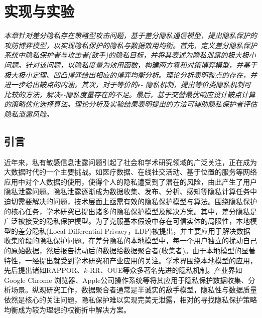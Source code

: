 \chapter{实现与实验}\label{chapter06}
{\em 本章针对差分隐私存在策略型攻击问题，基于差分隐私通信模型，提出隐私保护的攻防博弈模型，以实现隐私保护的隐私与数据效用均衡。首先，定义差分隐私保护系统中隐私保护者与攻击者(敌手)的隐私目标，并将其表述为隐私泄露的极大极小问题。针对该问题，以隐私度量为效用函数，构建两方零和对策博弈模型，并基于极大极小定理、凹凸博弈给出相应的博弈均衡分析。理论分析表明鞍点的存在，并进一步给出鞍点的内涵。其次，对于等价的$\epsilon$- 隐私机制，提出等价类隐私机制可比较的方法，解决$\epsilon$-隐私度量存在的不足。最后，基于交替最优响应设计鞍点计算的策略优化选择算法。理论分析及实验结果表明提出的方法可辅助隐私保护者评估隐私泄露风险。}
\section{引言}
近年来，私有敏感信息泄露问题引起了社会和学术研究领域的广泛关注，正在成为大数据时代的一个主要挑战。如医疗数据、在线社交活动、基于位置的服务等网络应用中对个人数据的使用，使得个人的隐私遭受到了潜在的风险，由此产生了用户隐私泄露问题。隐私泄露逐渐成为数据收集、发布、分析、感知等隐私计算\cite{Lifenghua16}任务中迫切需要解决的问题，技术层面上亟需有效的隐私保护模型与算法。围绕隐私保护的核心任务，学术研究已提出诸多的隐私保护模型及解决方案。其中，差分隐私\cite{dwork2006differential,dwork2006calibrating,dwork2014algorithmic}是广泛被接受的隐私保护模型。为了克服基本假设中存在可信实体的局限性，本地模型的差分隐私\cite{duchi2013local,duchi2013Minimax}(Local Differential Privacy，LDP)被提出，并主要应用于解决数据收集阶段的隐私保护问题。在差分隐私的本地模型中，每一个用户独立的扰动自己的原始数据，然后报告扰动后的数据给数据聚合者(收集者)。由于本地模型的显著特性，一经提出就受到学术研究和产业应用的关注。学术界围绕本地模型的应用，先后提出诸如RAPPOR\cite{fanti2016building,erlingsson2014rappor}、$k$-RR\cite{kairouz2016extremal}、OUE\cite{wang2017locally}等众多著名先进的隐私机制。产业界如Google Chrome 浏览器\cite{erlingsson2014rappor}、Apple公司操作系统\cite{tang2017privacy}等将其应用于隐私保护数据收集、分析场景。纵观研究工作，数据聚合者通常是半诚实的敌手模型，隐私性与数据质量依然是核心的关注问题，隐私保护难以实现完美无泄露，相对的寻找隐私保护策略均衡成为较为理想的权衡折中解决方案。

